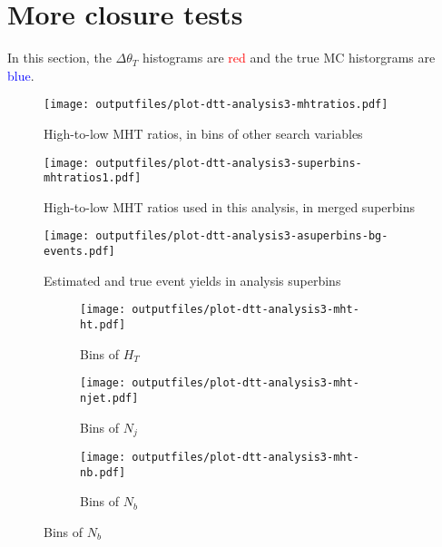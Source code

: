 \documentclass[11pt, oneside]{article}
\begin{document}
\clearpage




\section{More closure tests}

In this section, the $\Delta\theta_{T}$ histograms are \textcolor{red}{red} and the true MC historgrams are \textcolor{blue}{blue}.

\begin{figure}[h]
\centering
\caption{High-to-low MHT ratios, in bins of other search variables}
\texttt{[image: outputfiles/plot-dtt-analysis3-mhtratios.pdf]}
\end{figure}


\begin{figure}[h]
\centering
\caption{High-to-low MHT ratios used in this analysis, in merged superbins}
\texttt{[image: outputfiles/plot-dtt-analysis3-superbins-mhtratios1.pdf]}
\end{figure}


\begin{figure}[h]
\centering
\caption{Estimated and true event yields in analysis superbins}
\texttt{[image: outputfiles/plot-dtt-analysis3-asuperbins-bg-events.pdf]}
\end{figure}


\clearpage\begin{figure}[h]
\centering
\caption{MHT shapes, binned in other search variables}
\begin{subfigure}[b]{0.3\textwidth}
\texttt{[image: outputfiles/plot-dtt-analysis3-mht-ht.pdf]}
\caption{Bins of $H_{T}$}
\end{subfigure}
\begin{subfigure}[b]{0.3\textwidth}
\texttt{[image: outputfiles/plot-dtt-analysis3-mht-njet.pdf]}
\caption{Bins of $N_{j}$}
\end{subfigure}
\begin{subfigure}[b]{0.33\textwidth}
\texttt{[image: outputfiles/plot-dtt-analysis3-mht-nb.pdf]}
\caption{Bins of $N_{b}$}
\end{subfigure}
\end{figure}
\end{document}
